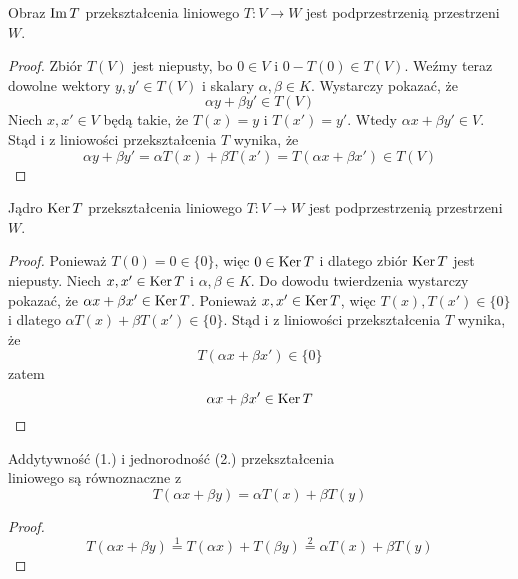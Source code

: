 \documentclass[a4paper,12pt]{article}
\begin{document}
\begin{theorem}
	Obraz $\operatorname{Im} T$ przekształcenia liniowego $T\colon V \to W$ jest podprzestrzenią przestrzeni $W$.
\end{theorem}
\begin{proof}
	Zbiór $T(V)$ jest niepusty, bo $0 \in V$ i $0 - T(0) \in T(V)$. Weźmy teraz dowolne wektory $y, y' \in T(V)$ i skalary $\alpha, \beta \in K$. Wystarczy pokazać, że 
	\[
		\alpha y + \beta y' \in T(V)
	\] 
	Niech $x, x' \in V$ będą takie, że $T(x) = y$ i $T(x') = y'$. Wtedy $\alpha x + \beta y' \in V$. Stąd i z liniowości przekształcenia $T$ wynika, że
	\[
		\alpha y + \beta y' = \alpha T(x) + \beta T(x') = T(\alpha x + \beta x') \in T(V)
	\]  
\end{proof}

\newpage

\begin{theorem}
	Jądro $\operatorname{Ker} T$ przekształcenia liniowego $T\colon V \to W$ jest podprzestrzenią przestrzeni $W$. 
\end{theorem}
\begin{proof}
	Ponieważ $T(0) = 0 \in \{0\}$, więc $0 \in \operatorname{Ker} T$ i dlatego zbiór $\operatorname{Ker} T$ jest niepusty. Niech $x,x' \in \operatorname{Ker} T$ i $\alpha, \beta \in K$. Do dowodu twierdzenia wystarczy pokazać, że $\alpha x + \beta x' \in \operatorname{Ker} T$. Ponieważ $x,x' \in \operatorname{Ker} T$, więc $T(x), T(x') \in \{0\}$ i dlatego $\alpha T(x) + \beta T(x') \in \{0\}$. Stąd i z liniowości przekształcenia $T$ wynika, że
	\[
		T(\alpha x + \beta x') \in \{0\} 
	\]
	zatem
	\[
		\alpha x + \beta x' \in \operatorname{Ker} T
	\]
\end{proof}

\begin{theorem}
	Addytywność (1.) i jednorodność (2.) przekształcenia \\
	liniowego są równoznaczne z 
	\[
		T(\alpha x + \beta y) = \alpha T(x) + \beta T(y)
	\]
\end{theorem}
\begin{proof}
	\[
		T(\alpha x + \beta y) \overset{1}{=} T(\alpha x) + T(\beta y) \overset{2}{=} \alpha T(x) + \beta T(y) 
	\]
\end{proof}

\end{document}
